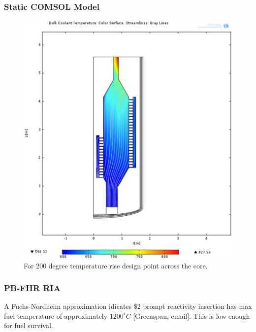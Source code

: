 \begin{frame}[fragile]
  \frametitle{Static COMSOL Model}

  \begin{figure}[htbp!]
    \begin{center}
      \includegraphics[height=0.7\textheight]{./priorart/coolant_temps_200_deg_rise.eps}
    \end{center}
    \caption{For 200 degree temperature rise design point across the core.}
    \label{fig:200degrise}
  \end{figure}
\end{frame}


\begin{frame}[fragile]
  \frametitle{PB-FHR RIA}
  A Fuchs-Nordheim approximation idicates \$2 prompt reactivity insertion has max 
  fuel temperature of approximately $1200^{\circ}C$ [Greenspan, email]. This is 
  low enough for fuel survival.
\end{frame}

